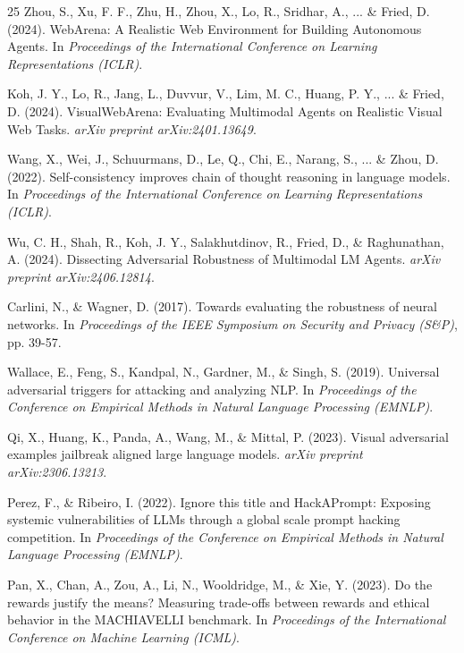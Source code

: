 \documentclass[runningheads]{llncs}
\begin{document}
\begin{thebibliography}{25}
Zhou, S., Xu, F. F., Zhu, H., Zhou, X., Lo, R., Sridhar, A., ... \& Fried, D. (2024). WebArena: A Realistic Web Environment for Building Autonomous Agents. In \textit{Proceedings of the International Conference on Learning Representations (ICLR)}.

Koh, J. Y., Lo, R., Jang, L., Duvvur, V., Lim, M. C., Huang, P. Y., ... \& Fried, D. (2024). VisualWebArena: Evaluating Multimodal Agents on Realistic Visual Web Tasks. \textit{arXiv preprint arXiv:2401.13649}.

Wang, X., Wei, J., Schuurmans, D., Le, Q., Chi, E., Narang, S., ... \& Zhou, D. (2022). Self-consistency improves chain of thought reasoning in language models. In \textit{Proceedings of the International Conference on Learning Representations (ICLR)}.

Wu, C. H., Shah, R., Koh, J. Y., Salakhutdinov, R., Fried, D., \& Raghunathan, A. (2024). Dissecting Adversarial Robustness of Multimodal LM Agents. \textit{arXiv preprint arXiv:2406.12814}.

Carlini, N., \& Wagner, D. (2017). Towards evaluating the robustness of neural networks. In \textit{Proceedings of the IEEE Symposium on Security and Privacy (S&P)}, pp. 39-57.

Wallace, E., Feng, S., Kandpal, N., Gardner, M., \& Singh, S. (2019). Universal adversarial triggers for attacking and analyzing NLP. In \textit{Proceedings of the Conference on Empirical Methods in Natural Language Processing (EMNLP)}.

Qi, X., Huang, K., Panda, A., Wang, M., \& Mittal, P. (2023). Visual adversarial examples jailbreak aligned large language models. \textit{arXiv preprint arXiv:2306.13213}.

Perez, F., \& Ribeiro, I. (2022). Ignore this title and HackAPrompt: Exposing systemic vulnerabilities of LLMs through a global scale prompt hacking competition. In \textit{Proceedings of the Conference on Empirical Methods in Natural Language Processing (EMNLP)}.

Pan, X., Chan, A., Zou, A., Li, N., Wooldridge, M., \& Xie, Y. (2023). Do the rewards justify the means? Measuring trade-offs between rewards and ethical behavior in the MACHIAVELLI benchmark. In \textit{Proceedings of the International Conference on Machine Learning (ICML)}.


\end{thebibliography}
\end{document}
